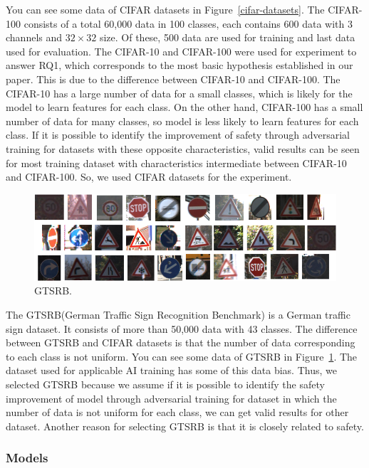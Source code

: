 \documentclass[journal,article,submit,moreauthors,pdftex]{Definitions/mdpi}
\begin{document}
You can see some data of CIFAR datasets in Figure~\ref{cifar-datasets}.
The CIFAR-100 consists of a total 60,000 data in 100 classes, each contains 600 data with 3 channels and \begin{math}{32\times 32}\end{math} size. Of these, 500 data are used for training and last data used for evaluation.
The CIFAR-10 and CIFAR-100 were used for experiment to answer RQ1, which corresponds to the most basic hypothesis established in our paper.
This is due to the difference between CIFAR-10 and CIFAR-100. The CIFAR-10 has a large number of data for a small classes, which is likely for the model to learn features for each class.
On the other hand, CIFAR-100 has a small number of data for many classes, so model is less likely to learn features for each class.
If it is possible to identify the improvement of safety through adversarial training for datasets with these opposite characteristics, valid results can be seen for most training dataset with characteristics intermediate between CIFAR-10 and CIFAR-100. So, we used CIFAR datasets for the experiment.

\begin{figure}[H]
\includegraphics[width=13 cm]{Definitions/gtsrb-dataset.png}
\caption{GTSRB.\label{gtsrb-dataset}}
\end{figure} 

The GTSRB(German Traffic Sign Recognition Benchmark) is a German traffic sign dataset. It consists of more than 50,000 data with 43 classes.
The difference between GTSRB and CIFAR datasets is that the number of data corresponding to each class is not uniform.
You can see some data of GTSRB in Figure~\ref{gtsrb-dataset}.
The dataset used for applicable AI training has some of this data bias.
Thus, we selected GTSRB because we assume if it is possible to identify the safety improvement of model through adversarial training for dataset in which the number of data is not uniform for each class, we can get valid results for other dataset.
Another reason for selecting GTSRB is that it is closely related to safety.

\subsubsection{Models}
\end{document}
